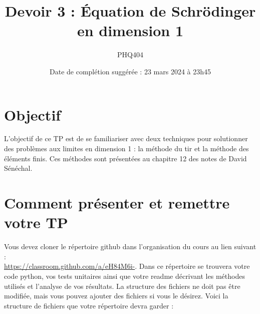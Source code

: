 \documentclass[12pt, letterpaper]{article}
\numberwithin{table}{section}
\numberwithin{figure}{section}
\numberwithin{equation}{section}
\begin{document}
\title{Devoir 3 : Équation de Schrödinger en dimension 1}
\author{PHQ404}
\date{Date de complétion suggérée : 23 mars 2024 à 23h45}
\maketitle

\section{Objectif}\label{sec:objectif}

\noindent L’objectif de ce TP est de se familiariser avec deux techniques pour solutionner des problèmes aux limites
en dimension 1 : la méthode du tir et la méthode des éléments finis.
Ces méthodes sont présentées au chapitre 12 des notes de David Sénéchal.


\section{Comment présenter et remettre votre TP}\label{sec:comment-presenter-et-remettre-votre-tp}

\noindent Vous devez cloner le répertoire github dans l'organisation du cours au lien suivant :\\
\href{https://classroom.github.com/a/eH84M6i-}{https://classroom.github.com/a/eH84M6i-}.
Dans ce répertoire se trouvera votre code python, vos tests unitaires ainsi que votre readme
décrivant les méthodes utilisés et l'analyse de vos résultats.
La structure des fichiers ne doit pas être modifiée, mais vous pouvez ajouter des fichiers si vous le désirez.
Voici la structure de fichiers que votre répertoire devra garder :

\bigskip
\end{document}
